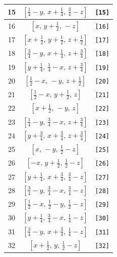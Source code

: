 \documentclass[fleqn,8pt]{jsarticle}
\begin{document}
\begin{longtable}{ccc}
15 & $\left[ \frac{1}{4} - y,\, x + \frac{1}{4},\, \frac{3}{4} - z \right]$ & {\tt [15]} \\ \hline
16 & $\left[ x,\, y + \frac{1}{2},\, - z \right]$ & {\tt [16]} \\ \hline
17 & $\left[ x + \frac{1}{2},\, y + \frac{1}{2},\, z + \frac{1}{2} \right]$ & {\tt [17]} \\ \hline
18 & $\left[ \frac{3}{4} - y,\, x + \frac{1}{4},\, z + \frac{3}{4} \right]$ & {\tt [18]} \\ \hline
19 & $\left[ y + \frac{1}{4},\, \frac{1}{4} - x,\, z + \frac{3}{4} \right]$ & {\tt [19]} \\ \hline
20 & $\left[ \frac{1}{2} - x,\, - y,\, z + \frac{1}{2} \right]$ & {\tt [20]} \\ \hline
21 & $\left[ \frac{1}{2} - x,\, y + \frac{1}{2},\, z \right]$ & {\tt [21]} \\ \hline
22 & $\left[ x + \frac{1}{2},\, - y,\, z \right]$ & {\tt [22]} \\ \hline
23 & $\left[ \frac{1}{4} - y,\, \frac{3}{4} - x,\, z + \frac{3}{4} \right]$ & {\tt [23]} \\ \hline
24 & $\left[ y + \frac{3}{4},\, x + \frac{3}{4},\, z + \frac{3}{4} \right]$ & {\tt [24]} \\ \hline
25 & $\left[ x,\, - y,\, \frac{1}{2} - z \right]$ & {\tt [25]} \\ \hline
26 & $\left[ - x,\, y + \frac{1}{2},\, \frac{1}{2} - z \right]$ & {\tt [26]} \\ \hline
27 & $\left[ y + \frac{1}{4},\, x + \frac{3}{4},\, \frac{3}{4} - z \right]$ & {\tt [27]} \\ \hline
28 & $\left[ \frac{3}{4} - y,\, \frac{3}{4} - x,\, \frac{3}{4} - z \right]$ & {\tt [28]} \\ \hline
29 & $\left[ \frac{1}{2} - x,\, \frac{1}{2} - y,\, \frac{1}{2} - z \right]$ & {\tt [29]} \\ \hline
30 & $\left[ y + \frac{1}{4},\, \frac{3}{4} - x,\, \frac{1}{4} - z \right]$ & {\tt [30]} \\ \hline
31 & $\left[ \frac{3}{4} - y,\, x + \frac{3}{4},\, \frac{1}{4} - z \right]$ & {\tt [31]} \\ \hline
32 & $\left[ x + \frac{1}{2},\, y,\, \frac{1}{2} - z \right]$ & {\tt [32]} \\
\end{longtable}
\end{document}
